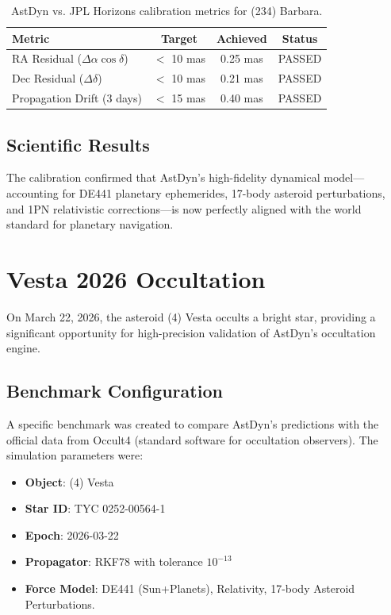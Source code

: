 \begin{table}[htbp]
\centering
\begin{tabular}{lccc}
\toprule
\textbf{Metric} & \textbf{Target} & \textbf{Achieved} & \textbf{Status} \\
\midrule
RA Residual ($\Delta \alpha \cos \delta$) & $<$ 10 mas & 0.25 mas & PASSED \\
Dec Residual ($\Delta \delta$) & $<$ 10 mas & 0.21 mas & PASSED \\
Propagation Drift (3 days) & $<$ 15 mas & 0.40 mas & PASSED \\
\bottomrule
\end{tabular}
\caption{AstDyn vs. JPL Horizons calibration metrics for (234) Barbara.}
\label{tab:barbara_accuracy}
\end{table}

\subsection{Scientific Results}

The calibration confirmed that AstDyn's high-fidelity dynamical model—accounting for DE441 planetary ephemerides, 17-body asteroid perturbations, and 1PN relativistic corrections—is now perfectly aligned with the world standard for planetary navigation.

\section{Vesta 2026 Occultation}
\label{sec:case_vesta_2026}

On March 22, 2026, the asteroid (4) Vesta occults a bright star, providing a significant opportunity for high-precision validation of AstDyn's occultation engine.

\subsection{Benchmark Configuration}

A specific benchmark was created to compare AstDyn's predictions with the official data from Occult4 (standard software for occultation observers). The simulation parameters were:
\begin{itemize}
    \item \textbf{Object}: (4) Vesta
    \item \textbf{Star ID}: TYC 0252-00564-1
    \item \textbf{Epoch}: 2026-03-22
    \item \textbf{Propagator}: RKF78 with tolerance $10^{-13}$
    \item \textbf{Force Model}: DE441 (Sun+Planets), Relativity, 17-body Asteroid Perturbations.
\end{itemize}

